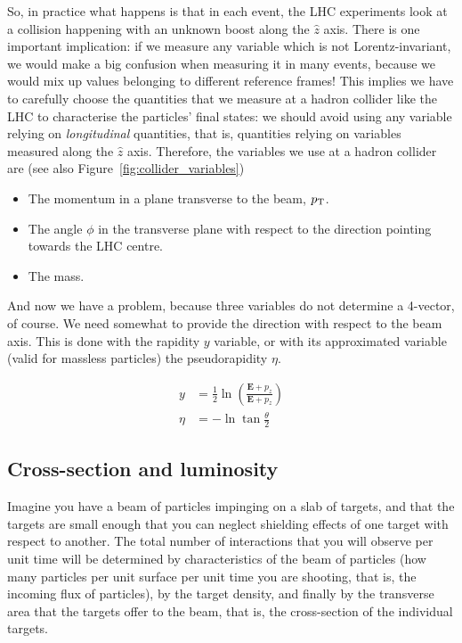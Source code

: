 So, in practice what happens is that in each event, the LHC experiments look at a collision happening with an unknown boost along the $\hat{z}$ axis. There is one important implication: if we measure any variable which is not Lorentz-invariant, we would make a big confusion when measuring it in many events, because we would mix up values belonging to different reference frames! This implies we have to carefully choose the quantities that we measure at a hadron collider like the LHC to characterise the particles' final states: we should avoid using any variable relying on \textit{longitudinal} quantities, that is, quantities relying on variables measured along the $\hat{z}$ axis. Therefore, the variables we use at a hadron collider are (see also Figure~\ref{fig:collider_variables}) 

\begin{itemize}
\item The momentum in a plane transverse to the beam, $p_{\mathrm{T}}$.
\item The angle $\phi$ in the transverse plane with respect to the direction pointing towards the LHC centre.
\item The mass.
\end{itemize}

And now we have a problem, because three variables do not determine a 4-vector, of course. We need somewhat to provide the direction with respect to the beam axis. This is done with the rapidity $y$ variable, or with its approximated variable (valid for massless particles) the pseudorapidity $\eta$. 

\begin{align*}
y &= \frac{1}{2} \ln \left(\frac{\mathbf{E} + p_z}{\mathbf{E} + p_z} \right) \\
\eta &= -\ln \tan \frac{\theta}{2}
\end{align*}

\subsection{Cross-section and luminosity}

Imagine you have a beam of particles impinging on a slab of targets, and that the targets are small enough that you can neglect shielding effects of one target with respect to another. The total number of interactions that you will observe per unit time will be determined by characteristics of the beam of particles (how many particles per unit surface per unit time you are shooting, that is, the incoming flux of particles), by the target density, and finally by the transverse area that the targets offer to the beam, that is, the cross-section of the individual targets. 

